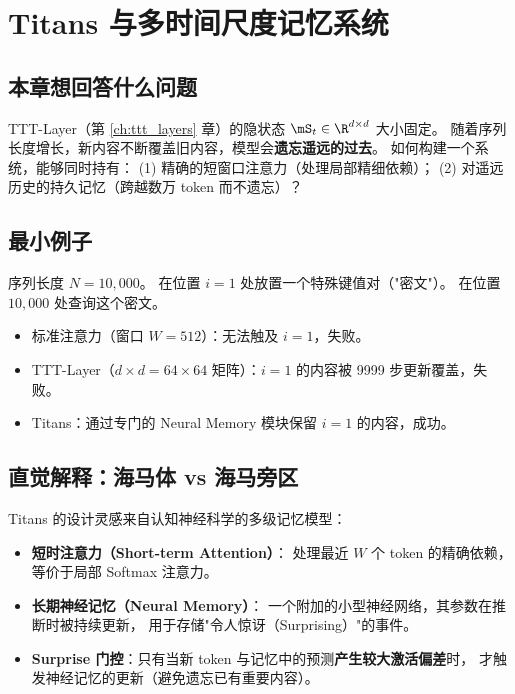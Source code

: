 \chapter{Titans 与多时间尺度记忆系统}
\label{ch:titans}

\section{本章想回答什么问题}

TTT-Layer（第 \ref{ch:ttt_layers} 章）的隐状态 $\mS_t \in \R^{d\times d}$ 大小固定。
随着序列长度增长，新内容不断覆盖旧内容，模型会\textbf{遗忘遥远的过去}。
如何构建一个系统，能够同时持有：
(1) 精确的短窗口注意力（处理局部精细依赖）；
(2) 对遥远历史的持久记忆（跨越数万 token 而不遗忘）？

\section{最小例子}

\begin{toybox}[title=玩具问题 B：超长序列中的针（Needle in a Haystack）]
序列长度 $N = 10{,}000$。
在位置 $i=1$ 处放置一个特殊键值对（"密文"）。
在位置 $10{,}000$ 处查询这个密文。

\begin{itemize}
  \item 标准注意力（窗口 $W=512$）：无法触及 $i=1$，失败。
  \item TTT-Layer（$d\times d=64\times 64$ 矩阵）：$i=1$ 的内容被 9999 步更新覆盖，失败。
  \item Titans：通过专门的 Neural Memory 模块保留 $i=1$ 的内容，成功。
\end{itemize}
\end{toybox}

\section{直觉解释：海马体 vs 海马旁区}

Titans 的设计灵感来自认知神经科学的多级记忆模型：
\begin{itemize}
  \item \textbf{短时注意力（Short-term Attention）}：
        处理最近 $W$ 个 token 的精确依赖，等价于局部 Softmax 注意力。
  \item \textbf{长期神经记忆（Neural Memory）}：
        一个附加的小型神经网络，其参数在推断时被持续更新，
        用于存储"令人惊讶（Surprising）"的事件。
  \item \textbf{Surprise 门控}：只有当新 token 与记忆中的预测\textbf{产生较大激活偏差}时，
        才触发神经记忆的更新（避免遗忘已有重要内容）。
\end{itemize}

